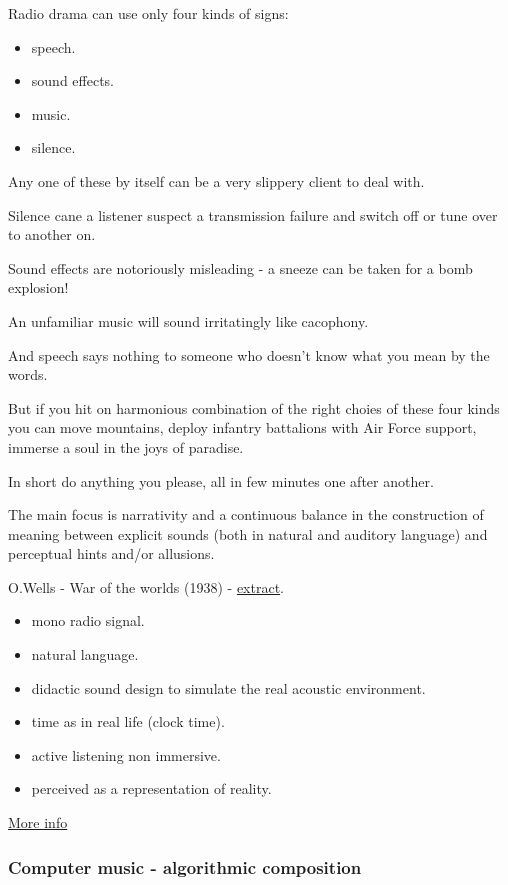 Radio drama can use only four kinds of signs:

\begin{itemize}
\tightlist
\item speech.
\item sound effects.
\item music.
\item silence.
\end{itemize}

Any one of these by itself can be a very slippery client to deal with.

Silence cane a listener suspect a transmission failure and switch off or tune over to another on.

Sound effects are notoriously misleading - a sneeze can be taken for a bomb explosion!

An unfamiliar music will sound irritatingly like cacophony.

And speech says nothing to someone who doesn't know what you mean by the words.

But if you hit on harmonious combination of the right choies of these four kinds you can move mountains, deploy infantry battalions with Air Force support, immerse a soul in the joys of paradise.

In short do anything you please, all in few minutes one after another.

The main focus is narrativity and a continuous balance in the construction of meaning between explicit sounds (both in natural and auditory language) and perceptual hints and/or allusions.

O.Wells - War of the worlds (1938) - \href{suoni/wells.mp3}{extract}.

\begin{itemize}
\tightlist
\item mono radio signal.
\item natural language.
\item didactic sound design to simulate the real acoustic environment.
\item time as in real life (clock time).
\item active listening non immersive.
\item perceived as a representation of reality.
\end{itemize}

\href{img/radio.pdf}{More info}

\subsubsection{Computer music - algorithmic composition}\label{computer-music---algorithmic-composition}

